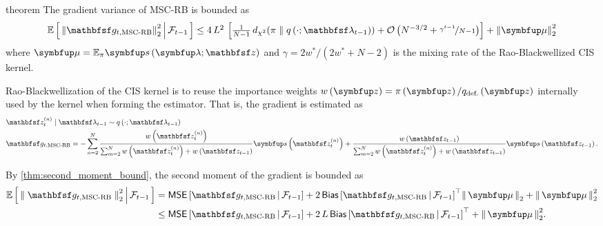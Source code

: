 \begin{theoremEnd}{theorem}{\citep{cardoso_brsnis_2022}}\label{thm:mscrb}
  The gradient variance of MSC-RB is bounded as
  {%
  \begin{align*}
  {\textstyle
    \E{ {\lVert \rvvg_{t,\mathrm{MSC\text{-}RB}} \rVert}_2^2  \,\middle|\, \mathcal{F}_{t-1} }
    \leq
    4 \, L^2 \,\left[
    \frac{1}{N-1}\,\DChi{\pi}{q\left(\cdot; \rvvlambda_{t-1}\right)} 
    +
    \mathcal{O}\left(N^{-3/2} + \nicefrac{\gamma^{t-1}}{N-1}\right)
    \right]
    +
    {\lVert\vmu\rVert}^2_2
  }
  \end{align*}
  }%
  where \(\vmu = \mathbb{E}_{\pi}\vs\left(\vlambda;\rvvz\right)\) and \(\gamma = 2 w^* / \left(2 w^* + N - 2\right)\) is the mixing rate of the Rao-Blackwellized CIS kernel.
\end{theoremEnd}
\begin{proofEnd}
  Rao-Blackwellization of the CIS kernel is to reuse the importance weights \(w\left(\vz\right) = \pi\left(\vz\right) / q_{\text{def.}}\left(\vz\right)\) internally used by the kernel when forming the estimator.
  That is, the gradient is estimated as
  \begin{align*}
    &\rvvz^{(n)}_t \mid \rvvlambda_{t-1} \sim q\left(\cdot; \rvvlambda_{t-1}\right) \\
    &\rvvg_{t,\text{MSC-RB}} = -\sum^{N}_{n=2} \frac{w\left(\rvvz^{(n)}_t\right)}{\sum^{N}_{m=2}w\left(\rvvz^{(n)}_t\right) + w\left(\rvvz_{t-1}\right)} \vs\left(\rvvz^{(n)}_t\right) + \frac{w\left(\rvvz_{t-1}\right)}{\sum^{N}_{m=2}w\left(\rvvz^{(n)}_t\right) + w\left(\rvvz_{t-1}\right)} \vs\left(\rvvz_{t-1}\right).
  \end{align*}

  By \cref{thm:second_moment_bound}, the second moment of the gradient is bounded as
  \begin{alignat}{2}
    \E{ {\parallel \rvvg_{t,\text{MSC-RB}} \parallel}_2^2 \,\middle|\, \mathcal{F}_{t-1} } 
    &=
    \mathsf{MSE}\left[ \rvvg_{t, \text{MSC-RB}} \,\middle|\, \mathcal{F}_{t-1} \right]
    +
    2 \, {\mathsf{Bias}\left[ \rvvg_{t, \text{MSC-RB}} \,\middle|\, \mathcal{F}_{t-1} \right]}^{\top} \norm{\vmu}_2
    + \norm{\vmu}^2_2
    \nonumber
    \\
    &\leq
    \mathsf{MSE}\left[ \rvvg_{t, \text{MSC-RB}} \,\middle|\, \mathcal{F}_{t-1} \right]
    +
    2 \, L \, {\mathsf{Bias}\left[ \rvvg_{t, \text{MSC-RB}} \,\middle|\, \mathcal{F}_{t-1} \right]}^{\top}
    + \norm{\vmu}^2_2.
    \label{eq:mscrb_decomp}
  \end{alignat}
  

\end{proofEnd}
